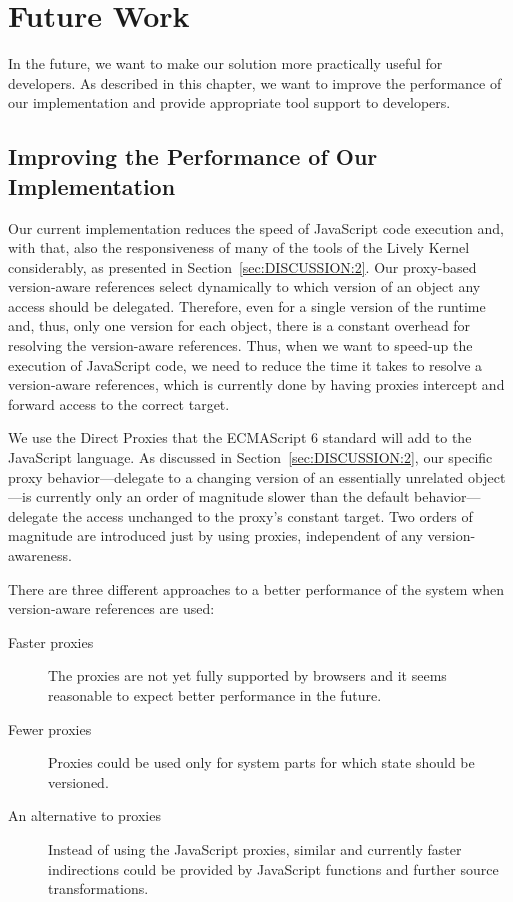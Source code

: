 \chapter{Future Work} \label{chapter:FUTURE_WORK}

In the future, we want to make our solution more practically useful for developers.
As described in this chapter, we want to improve the performance of our implementation and provide appropriate tool support to developers.



\section{Improving the Performance of Our Implementation} \label{sec:FUTURE_WORK:1}

Our current implementation reduces the speed of JavaScript code execution and, with that, also the responsiveness of many of the tools of the Lively Kernel considerably, as presented in Section~\ref{sec:DISCUSSION:2}.
Our proxy-based version-aware references select dynamically to which version of an object any access should be delegated.
Therefore, even for a single version of the runtime and, thus, only one version for each object, there is a constant overhead for resolving the version-aware references.
Thus, when we want to speed-up the execution of JavaScript code, we need to reduce the time it takes to resolve a version-aware references, which is currently done by having proxies intercept and forward access to the correct target.

We use the Direct Proxies that the ECMAScript 6 standard will add to the JavaScript language.
As discussed in Section~\ref{sec:DISCUSSION:2}, our specific proxy behavior---delegate to a changing version of an essentially unrelated object---is currently only an order of magnitude slower than the default behavior---delegate the access unchanged to the proxy's constant target.
Two orders of magnitude are introduced just by using proxies, independent of any version-awareness.

There are three different approaches to a better performance of the system when version-aware references are used:

\begin{description}
    \item[Faster proxies] The proxies are not yet fully supported by browsers and it seems reasonable to expect better performance in the future.
    \item[Fewer proxies] Proxies could be used only for system parts for which state should be versioned.
    \item[An alternative to proxies] Instead of using the JavaScript proxies, similar and currently faster indirections could be provided by JavaScript functions and further source transformations.
\end{description}

